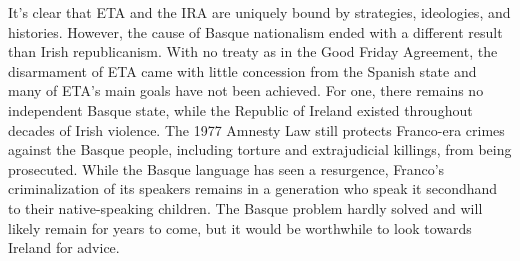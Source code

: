 \documentclass[basque,american]{../../../coursework}
\begin{document}
It's clear that ETA and the IRA are uniquely bound by strategies, ideologies,
and histories. However, the cause of Basque nationalism ended with a different
result than Irish republicanism. With no treaty as in the Good Friday
Agreement, the disarmament of ETA came with little concession from the Spanish
state and many of ETA's main goals have not been achieved. For one, there
remains no independent Basque state, while the Republic of Ireland existed
throughout decades of Irish violence. The 1977 Amnesty Law still protects
Franco-era crimes against the Basque people, including torture and
extrajudicial killings, from being prosecuted. While the Basque language has
seen a resurgence, Franco's criminalization of its speakers remains in a
generation who speak it secondhand to their native-speaking children. The
Basque problem hardly solved and will likely remain for years to come, but it
would be worthwhile to look towards Ireland for advice.

\printbibliography
\end{document}
